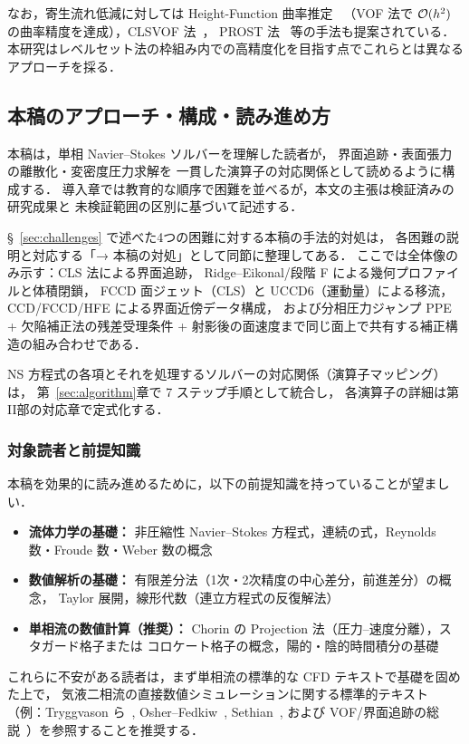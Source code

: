 なお，寄生流れ低減に対しては Height-Function 曲率推定~\cite{Popinet2009}%
（VOF 法で $\mathcal{O}(h^2)$ の曲率精度を達成），CLSVOF 法~\cite{Sussman2000}，
PROST 法~\cite{Renardy2002}%
等の手法も提案されている．
本研究はレベルセット法の枠組み内での高精度化を目指す点でこれらとは異なるアプローチを採る．

\subsection{本稿のアプローチ・構成・読み進め方}
\label{sec:roadmap}

本稿は，単相 Navier--Stokes ソルバーを理解した読者が，
界面追跡・表面張力の離散化・変密度圧力求解を
一貫した演算子の対応関係として読めるように構成する．
導入章では教育的な順序で困難を並べるが，本文の主張は検証済みの研究成果と
未検証範囲の区別に基づいて記述する．

§~\ref{sec:challenges} で述べた4つの困難に対する本稿の手法的対処は，
各困難の説明と対応する「→ 本稿の対処」として同節に整理してある．
ここでは全体像のみ示す：CLS 法による界面追跡，
Ridge--Eikonal/段階 F による幾何プロファイルと体積閉鎖，
FCCD 面ジェット（CLS）と UCCD6（運動量）による移流，
CCD/FCCD/HFE による界面近傍データ構成，
および分相圧力ジャンプ PPE + 欠陥補正法の残差受理条件 +
射影後の面速度まで同じ面上で共有する補正構造の組み合わせである．

NS 方程式の各項とそれを処理するソルバーの対応関係（演算子マッピング）は，
第~\ref{sec:algorithm}章で 7 ステップ手順として統合し，
各演算子の詳細は第II部の対応章で定式化する．

\subsubsection{対象読者と前提知識}

本稿を効果的に読み進めるために，以下の前提知識を持っていることが望ましい．
\begin{itemize}
  \item \textbf{流体力学の基礎：}
        非圧縮性 Navier--Stokes 方程式，連続の式，Reynolds 数・Froude 数・Weber 数の概念
  \item \textbf{数値解析の基礎：}
        有限差分法（1次・2次精度の中心差分，前進差分）の概念，
        Taylor 展開，線形代数（連立方程式の反復解法）
  \item \textbf{単相流の数値計算（推奨）：}
        Chorin の Projection 法（圧力--速度分離），スタガード格子または
        コロケート格子の概念，陽的・陰的時間積分の基礎
\end{itemize}
これらに不安がある読者は，まず単相流の標準的な CFD テキストで基礎を固めた上で，
気液二相流の直接数値シミュレーションに関する標準的テキスト
（例：Tryggvason ら~\cite{Tryggvason2011}, Osher--Fedkiw~\cite{OsherFedkiw2003}, Sethian~\cite{Sethian1999}, および VOF/界面追跡の総説~\cite{ScardovelliZaleski1999}）を参照することを推奨する．

